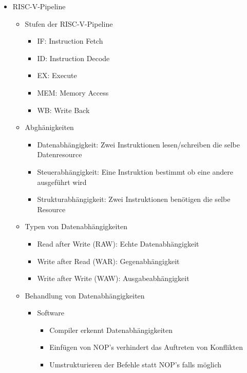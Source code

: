 \documentclass{kit}
\begin{document}
\begin{itemize}
\begin{itemize}
\begin{itemize}
          \end{itemize}
      \end{itemize}
    \item RISC-V-Pipeline
      \begin{itemize}
        \item Stufen der RISC-V-Pipeline
          \begin{itemize}
            \item IF: Instruction Fetch
            \item ID: Instruction Decode
            \item EX: Execute
            \item MEM: Memory Access
            \item WB: Write Back
          \end{itemize}
        \item Abghänigkeiten
          \begin{itemize}
            \item Datenabhängigkeit: Zwei Instruktionen lesen/schreiben die selbe Datenresource
            \item Steuerabhängigkeit: Eine Instruktion bestimmt ob eine andere ausgeführt wird
            \item Strukturabhängigkeit: Zwei Instruktionen benötigen die selbe Resource
          \end{itemize}
        \item Typen von Datenabhängigkeiten
          \begin{itemize}
            \item Read after Write (RAW): Echte Datenabhängigkeit
            \item Write after Read (WAR): Gegenabhängigkeit
            \item Write after Write (WAW): Ausgabeabhängigkeit
          \end{itemize}
        \item Behandlung von Datenabhängigkeiten
          \begin{itemize}
              \item Software
                \begin{itemize}
                  \item Compiler erkennt Datenabhängigkeiten
                  \item Einfügen von NOP's verhindert das Auftreten von Konflikten
                  \item Umstrukturieren der Befehle statt NOP's falls möglich

\end{itemize}
\end{itemize}
\end{itemize}
\end{itemize}
\end{document}

